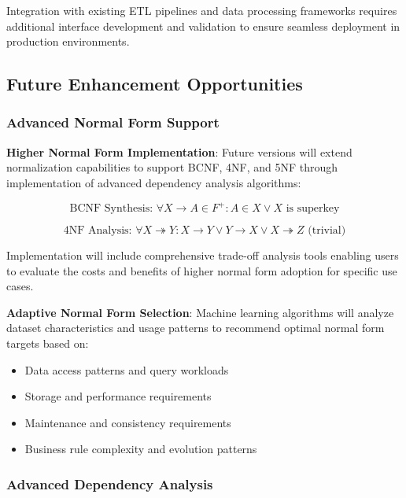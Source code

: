 \documentclass[acmsmall]{acmart}
\begin{document}
Integration with existing ETL pipelines and data processing frameworks requires additional interface development and validation to ensure seamless deployment in production environments.

\subsection{Future Enhancement Opportunities}

\subsubsection{Advanced Normal Form Support}

\textbf{Higher Normal Form Implementation}: Future versions will extend normalization capabilities to support BCNF, 4NF, and 5NF through implementation of advanced dependency analysis algorithms:

\begin{equation}
\text{BCNF Synthesis: } \forall X \to A \in F^+: A \in X \lor X \text{ is superkey}
\end{equation}

\begin{equation}  
\text{4NF Analysis: } \forall X \twoheadrightarrow Y: X \to Y \lor Y \to X \lor X \twoheadrightarrow Z \text{ (trivial)}
\end{equation}

Implementation will include comprehensive trade-off analysis tools enabling users to evaluate the costs and benefits of higher normal form adoption for specific use cases.

\textbf{Adaptive Normal Form Selection}: Machine learning algorithms will analyze dataset characteristics and usage patterns to recommend optimal normal form targets based on:
\begin{itemize}
\item Data access patterns and query workloads
\item Storage and performance requirements  
\item Maintenance and consistency requirements
\item Business rule complexity and evolution patterns
\end{itemize}

\subsubsection{Advanced Dependency Analysis}
\end{document}
